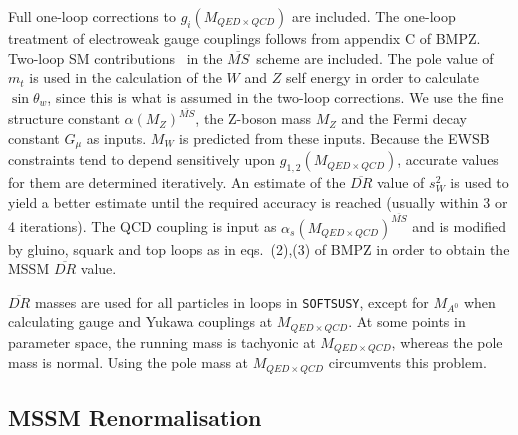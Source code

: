 \documentclass{article}
\def\SOFTSUSY{{\tt SOFTSUSY}}
\begin{document}
Full one-loop corrections to $g_i(M_{QED \times QCD})$ are
included. 
The one-loop treatment of electroweak gauge couplings follows
from appendix C of BMPZ. Two-loop SM contributions~\cite{degrassi} in the
$\overline{MS}$~scheme are included. The pole value
of $m_t$ is used in the calculation of the $W$ and $Z$ self energy in order to
calculate $\sin \theta_w$, since this is what is assumed in the two-loop
corrections. 
We use the fine structure constant $\alpha(M_{Z})^{\overline{MS}}$, the Z-boson
mass 
$M_Z$ and the Fermi decay constant $G_\mu$ as inputs. $M_W$ is predicted from
these inputs.
Because the EWSB constraints tend to 
depend sensitively upon $g_{1,2}(M_{QED \times QCD})$, accurate values for them are
determined iteratively. 
An estimate of the $\overline{DR}$ value of $s_W^2$ is used to yield a
better estimate until the required accuracy is reached (usually within 3 or
4 iterations).
The QCD coupling is input as $\alpha_s(M_{QED \times QCD})^{\overline{MS}}$ and
is modified by gluino, squark and top loops as in
eqs.~(2),(3) of BMPZ in order to obtain the MSSM $\overline{DR}$ value. 

$\overline{DR}$ masses are used for all particles in loops in \SOFTSUSY, except
for $M_{A^0}$ when calculating gauge and Yukawa couplings at $M_{QED \times QCD}$. At some
points in parameter space, the running mass is tachyonic at $M_{QED \times QCD}$, whereas the
pole mass is normal. Using the pole mass at $M_{QED \times QCD}$ circumvents
this problem. 

\subsection{MSSM Renormalisation}
\end{document}
